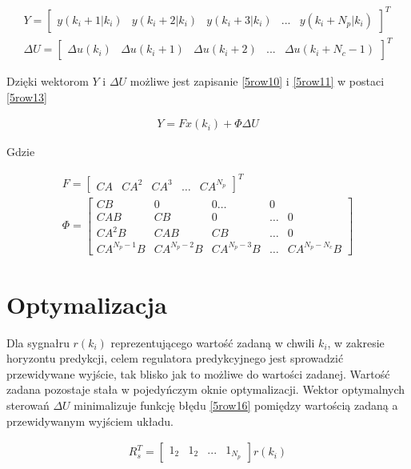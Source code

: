 \begin{gather}
\label{5row12}
Y=\begin{bmatrix} y(k_i+1 |k_i) & y(k_i+2 |k_i) & y(k_i+3 |k_i) & ... & y(k_i+N_p |k_i) \end{bmatrix} ^T\\
\nonumber \Delta U= \begin{bmatrix} \Delta u(k_i) & \Delta u(k_i+1) &  \Delta u(k_i+2) & ... &  \Delta u(k_i+N_c-1) \end{bmatrix} ^T
\end{gather}

Dzięki wektorom $Y$ i $\Delta U$ możliwe jest zapisanie \ref{5row10} i \ref{5row11} w postaci  \ref{5row13}

\begin{gather}
\label{5row13}
Y=Fx(k_i)+ \Phi \Delta U
\end{gather}

Gdzie

\begin{gather}
\label{5row14}
F= \begin{bmatrix} CA & CA^2 & CA^3 & \dots & CA^{N_p}\end{bmatrix}^T \\
\nonumber \Phi =  \begin{bmatrix} CB & 0 & 0 \dots & 0 \\
CAB & CB & 0 & \dots & 0 \\
CA^2B & CAB & CB & \dots & 0 \\%
CA^{N_p-1}B & CA^{N_p-2}B & CA^{N_p-3}B & \dots & CA^{N_p-N_c}B \end{bmatrix}
\end{gather}

\section{Optymalizacja}
\label{mpc_optym}
Dla sygnałru $r(k_i)$ reprezentującego wartość zadaną w chwili $k_i$, w zakresie horyzontu predykcji, celem regulatora predykcyjnego jest sprowadzić przewidywane wyjście, tak blisko jak to możliwe do wartości zadanej. Wartość zadana pozostaje stała w pojedyńczym oknie optymalizacji. Wektor optymalnych sterowań $\Delta U$ minimalizuje funkcję błędu \ref{5row16} pomiędzy wartością zadaną a przewidywanym wyjściem układu.

\begin{gather}
\label{5row15}
R^T_s= \begin{bmatrix} 1_2 & 1_2 & ... & 1_{N_p}\end{bmatrix} r(k_i) 
\end{gather}


